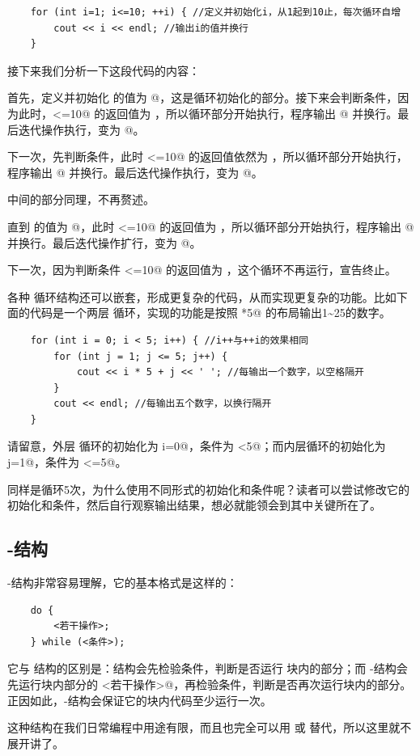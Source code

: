 \begin{lstlisting}
    for (int i=1; i<=10; ++i) { //定义并初始化i，从1起到10止，每次循环自增
        cout << i << endl; //输出i的值并换行
    }
\end{lstlisting}
接下来我们分析一下这段代码的内容：\par
首先，定义并初始化 \lstinline@i@ 的值为 @，这是循环初始化的部分。接下来会判断条件，因为此时，\lstinline@i<=10@ 的返回值为 \lstinline@true@，所以循环部分开始执行，程序输出 @ 并换行。最后迭代操作执行，\lstinline@i@ 变为 @。\par
下一次，先判断条件，此时 \lstinline@i<=10@ 的返回值依然为 \lstinline@true@，所以循环部分开始执行，程序输出 @ 并换行。最后迭代操作执行，\lstinline@i@ 变为 @。\par
中间的部分同理，不再赘述。\par
直到 \lstinline@i@ 的值为 @，此时 \lstinline@i<=10@ 的返回值为 \lstinline@true@，所以循环部分开始执行，程序输出 @ 并换行。最后迭代操作扩行，\lstinline@i@ 变为 @。\par
下一次，因为判断条件 \lstinline@i<=10@ 的返回值为 \lstinline@false@，这个循环不再运行，宣告终止。\par
各种 \lstinline@for@ 循环结构还可以嵌套，形成更复杂的代码，从而实现更复杂的功能。比如下面的代码是一个两层 \lstinline@for@ 循环，实现的功能是按照 *5@ 的布局输出1\~{}25的数字。\par
\begin{lstlisting}
    for (int i = 0; i < 5; i++) { //i++与++i的效果相同
        for (int j = 1; j <= 5; j++) {
            cout << i * 5 + j << ' '; //每输出一个数字，以空格隔开
        }
        cout << endl; //每输出五个数字，以换行隔开
    }
\end{lstlisting}\par
请留意，外层 \lstinline@for@ 循环的初始化为 \lstinline@int i=0@，条件为 \lstinline@i<5@；而内层循环的初始化为 \lstinline@int j=1@，条件为 \lstinline@j<=5@。\par
同样是循环5次，为什么使用不同形式的初始化和条件呢？读者可以尝试修改它的初始化和条件，然后自行观察输出结果，想必就能领会到其中关键所在了。\par
\subsection*{\lstinline@do@-\lstinline@while@ 结构}
\lstinline@do@-\lstinline@while@ 结构非常容易理解，它的基本格式是这样的：
\begin{lstlisting}
    do {
        <若干操作>;
    } while (<条件>);
\end{lstlisting}
它与 \lstinline@while@ 结构的区别是：\lstinline@while@ 结构会先检验条件，判断是否运行 \lstinline@while@ 块内的部分；而 \lstinline@do@-\lstinline@while@ 结构会先运行块内部分的 \lstinline@<若干操作>@，再检验条件，判断是否再次运行块内的部分。正因如此，\lstinline@do@-\lstinline@while@ 结构会保证它的块内代码至少运行一次。\par
这种结构在我们日常编程中用途有限，而且也完全可以用 \lstinline@while@ 或 \lstinline@for@ 替代，所以这里就不展开讲了。\par
